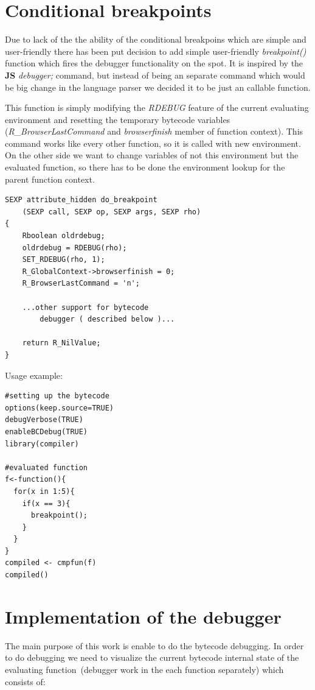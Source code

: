 \documentclass[thesis=M,english]{FITthesis}[2018/10/20]
\begin{document}
\section{Conditional breakpoints}\label{conditional-breakpoints}

Due to lack of the the ability of the conditional breakpoins which are simple and user-friendly there has been put decision to add simple user-friendly \textit{breakpoint()} function which fires the debugger functionality on the spot. It is inspired by the \textbf{JS} \textit{debugger;} command, but instead of being an separate command which would be big change in the language parser we decided it to be just an callable function.

This function is simply modifying the \textit{RDEBUG} feature of the current evaluating environment and resetting the temporary bytecode variables (\textit{R{\_}BrowserLastCommand} and \textit{browserfinish} member of function context). This command works like every other function, so it is called with new environment. On the other side we want to change variables of not this environment but the evaluated function, so there has to be done the environment lookup for the parent function context.

\begin{lstlisting}
SEXP attribute_hidden do_breakpoint
	(SEXP call, SEXP op, SEXP args, SEXP rho)
{
    Rboolean oldrdebug;
    oldrdebug = RDEBUG(rho);
    SET_RDEBUG(rho, 1);
    R_GlobalContext->browserfinish = 0;
    R_BrowserLastCommand = 'n';

	...other support for bytecode 
		debugger ( described below )...

    return R_NilValue;
}
\end{lstlisting}

Usage example:
\begin{lstlisting}
#setting up the bytecode
options(keep.source=TRUE)
debugVerbose(TRUE)
enableBCDebug(TRUE)
library(compiler)

#evaluated function
f<-function(){
  for(x in 1:5){
    if(x == 3){
	  breakpoint();
	}
  }
}
compiled <- cmpfun(f)
compiled()
\end{lstlisting}


\section{Implementation of the debugger}

The main purpose of this work is enable to do the bytecode debugging. In order to do debugging we need to visualize the current bytecode internal state of the evaluating function~(debugger work in the each function separately) which consists of:
\end{document}
